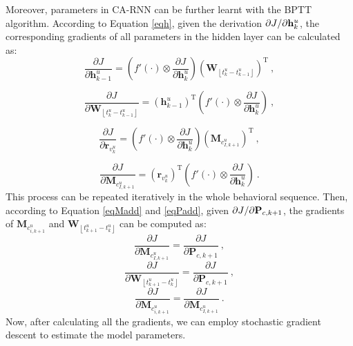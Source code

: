\documentclass{sig-alternate}
\begin{document}
Moreover, parameters in CA-RNN can be further learnt with the BPTT algorithm. According to Equation \eqref{eqh}, given the derivation ${\partial J \mathord{\left/ \right. \kern-\nulldelimiterspace} {\partial \mathbf{h}_{k}^{u} } }$, the corresponding gradients of all parameters in the hidden layer can be calculated as: 
\begin{displaymath}
\frac{{\partial J}}{{\partial \mathbf{h}^u_{k-1} }} =  \left( {f'\left(  \cdot  \right) \otimes \frac{{\partial J}}{{\partial \mathbf{h}^u_{k} }}} \right)\left({\mathbf{W}_{\left \lfloor t_{k}^{u} - t_{k-1}^{u} \right \rfloor}}\right)^\mathrm{T} ~,
\end{displaymath}

\begin{displaymath}
\frac{{\partial J}}{{\partial {\mathbf{W}_{\left \lfloor t_{k}^{u} - t_{k-1}^{u} \right \rfloor}} }} =  \left({\mathbf{h}_{k-1}^u}\right)^\mathrm{T}\left( {f'\left(  \cdot  \right) \otimes \frac{{\partial J}}{{\partial \mathbf{h}^u_{k} }}} \right) ~,
\end{displaymath}

\begin{displaymath}
\frac{{\partial J}}{{\partial \mathbf{r}_{v_k^u} }} =  \left( {f'\left(  \cdot  \right) \otimes \frac{{\partial J}}{{\partial \mathbf{h}^u_{k} }}} \right)\left({\mathbf{M}_{c^u_{I,k+1}}}\right)^\mathrm{T} ~,
\end{displaymath}

\begin{displaymath}
\frac{{\partial J}}{{\partial {\mathbf{M}_{c^u_{I,k+1}}} }} =  \left({\mathbf{r}_{v^u_k}}\right)^\mathrm{T}\left( {f'\left(  \cdot  \right) \otimes \frac{{\partial J}}{{\partial \mathbf{h}^u_{k} }}} \right) ~.
\end{displaymath}
This process can be repeated iteratively in the whole behavioral sequence. 
Then, according to Equation \eqref{eqMadd} and \eqref{eqPadd}, given ${\partial J \mathord{\left/ \right. \kern-\nulldelimiterspace} {\partial \mathbf{P}_{c,k+1} } }$, the gradients of $\mathbf{M}_{c^u_{i,k+1}}$ and $\mathbf{W}_{\left \lfloor t_{k+1}^{u} - t_{k}^{u} \right \rfloor}$ can be computed as: 
\begin{displaymath}
\frac{{\partial J}}{{\partial {\mathbf{M}_{c^u_{I,k+1}}} }} =  \frac{\partial J}{\partial \mathbf{P}_{c,k+1}} ~,
\end{displaymath}
\begin{displaymath}
\frac{{\partial J}}{{\partial {\mathbf{W}_{\left \lfloor t_{k+1}^{u} - t_{k}^{u} \right \rfloor}} }} =  \frac{\partial J}{\partial \mathbf{P}_{c,k+1}} ~,
\end{displaymath}
\begin{displaymath}
\frac{{\partial J}}{{\partial {\mathbf{M}_{c^u_{i,k+1}}} }} =  \frac{\partial J}{\partial \mathbf{M}_{c^u_{I,k+1}}} ~.
\end{displaymath}
Now, after calculating all the gradients, we can employ stochastic gradient descent to estimate the model parameters. 
\end{document}
